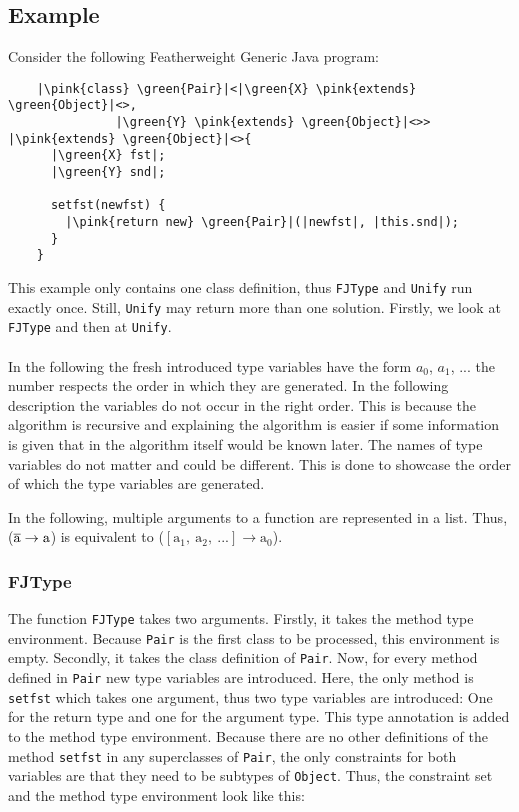 \subsection{Example}

Consider the following Featherweight Generic Java program:

\begin{verbatim}
    |\pink{class} \green{Pair}|<|\green{X} \pink{extends} \green{Object}|<>,
               |\green{Y} \pink{extends} \green{Object}|<>> |\pink{extends} \green{Object}|<>{
      |\green{X} fst|;
      |\green{Y} snd|;

      setfst(newfst) {
        |\pink{return new} \green{Pair}|(|newfst|, |this.snd|);
      }
    }
\end{verbatim}

This example only contains one class definition, thus \verb|FJType| and \verb|Unify| run exactly once. Still, \verb|Unify| may return more than one solution.
Firstly, we look at \verb|FJType| and then at \verb|Unify|.
\\
\\
In the following the fresh introduced type variables have the form $a_0$, $a_1$, ... the number respects the order in which they are generated. In the following description the variables do not occur in the right order. This is because the algorithm is recursive and explaining the algorithm is easier
if some information is given that in the algorithm itself would be known later. The names of type variables do not matter and could be different. This is done to showcase the order of which the type variables are generated.

In the following, multiple arguments to a function are represented in a list. Thus, ($\overline{\text{a}} \to \text{a}$) is equivalent to ($[\text{a}_1, \ \text{a}_2, \ ...] \to \text{a}_0$).

\subsubsection{FJType}
The function \verb|FJType| takes two arguments. Firstly, it takes the method type environment. Because \verb|Pair| is the first class to be processed, this environment is empty. Secondly, it takes the class definition of \verb|Pair|.
Now, for every method defined in \verb|Pair| new type variables are introduced. Here, the only method is \verb|setfst| which takes one argument, thus two type variables are introduced: One for the return type and one for the argument type. This type annotation is added to the method type environment.
Because there are no other definitions of the method \verb|setfst| in any superclasses of \verb|Pair|, the only constraints for both variables are that they need to be subtypes of \verb|Object|. Thus, the constraint set and the method type environment look like this:

